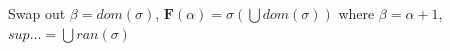 \documentclass[10pt, landscape]{article}
\begin{document}
\begin{multicols*}{3}
Swap out $\beta=dom(\sigma)$, $\mathbf{F}(\alpha)=\sigma(\bigcup dom(\sigma))$ where $\beta=\alpha+1$, $sup...=\bigcup ran(\sigma)$




\end{multicols*}
\end{document}
